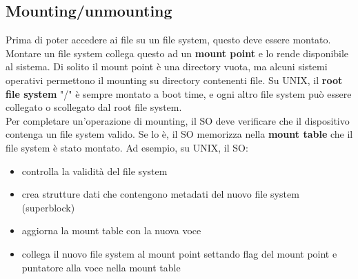\documentclass[12pt]{article}
\begin{document}
\subsection{Mounting/unmounting}
Prima di poter accedere ai file su un file system, questo deve essere montato. Montare un file system collega questo ad
un \textbf{mount point} e lo rende disponibile al sistema. Di solito il mount point è una directory vuota, ma alcuni 
sistemi operativi permettono il mounting su directory contenenti file.
Su UNIX, il \textbf{root file system} "/" è sempre montato a boot time, e ogni altro file system può essere collegato o
scollegato dal root file system.\\
Per completare un'operazione di mounting, il SO deve verificare che il dispositivo contenga un file system valido. Se lo
è, il SO memorizza nella \textbf{mount table} che il file system è stato montato. Ad esempio, su UNIX, il SO:
\begin{itemize}
    \item controlla la validità del file system
    \item crea strutture dati che contengono metadati del nuovo file system (superblock)
    \item aggiorna la mount table con la nuova voce
    \item collega il nuovo file system al mount point settando flag del mount point e puntatore alla voce nella mount
    table
\end{itemize}
\end{document}
